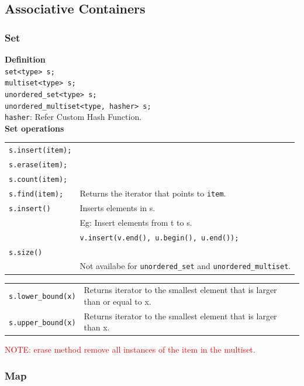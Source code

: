 \subsection{Associative Containers}

\subsubsection{Set}
\textbf{Definition}\\
\texttt{set<type> s;}\\
\texttt{multiset<type> s;}\\
\texttt{unordered\_set<type> s;}\\
\texttt{unordered\_multiset<type, hasher> s;}\\
\texttt{hasher}: Refer Custom Hash Function.\\


\textbf{Set operations}\\
\begin{tabularx}{\linewidth}{lX}
\texttt{s.insert(item);} & \\
\texttt{s.erase(item);} & \\
\texttt{s.count(item);} & \\
\texttt{s.find(item);} & Returns the iterator that points to \texttt{item}.\\
\texttt{s.insert()} & Inserts elements in s.\\
& Eg: Insert elements from t to s.\\
& \texttt{v.insert(v.end(), u.begin(), u.end());}\\
\texttt{s.size()} & \\
& Not availabe for \texttt{unordered\_set}  and \texttt{unordered\_multiset}.\\
\end{tabularx}

\begin{tabularx}{\linewidth}{lX}
\texttt{s.lower\_bound(x)} & Returns iterator to the smallest element that is larger than or equal to x.\\
\texttt{s.upper\_bound(x)} & Returns iterator to the smallest element that is larger than x.\\
\end{tabularx}

\textcolor{red}{NOTE: erase method remove all instances of the item in the multiset.}

\subsubsection{Map}


